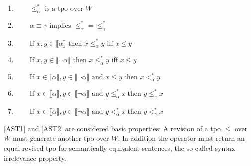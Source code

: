 \documentclass[english, 12pt]{scrartcl}
\theoremstyle{definition}
\theoremstyle{definition}
\theoremstyle{definition}
\newcommand{\modelsOf}[1]{\llbracket #1 \rrbracket}
\begin{document}
\begin{enumerate}[wide=0pt, widest=99,leftmargin=\parindent,label = ($\ast\arabic*$)]
    \item\label{AST1} $\qquad \leq_{\alpha}^{\ast} \textrm{ is a tpo over } W$
    \item\label{AST2} $\qquad\alpha \equiv \gamma \textrm{ implies } \leq_{\alpha}^{\ast}=\leq_{\gamma}^{\ast}$
    \item\label{AST3} $\qquad \textrm{If } x, y \in \modelsOf{\alpha} \textrm{ then } x \leq_{\alpha}^{\ast} y \textrm{ iff } x \leq y$
    \item\label{AST4} $\qquad \textrm{If } x, y \in \modelsOf{\neg\alpha} \textrm{ then } x \leq_{\alpha}^{\ast} y \textrm{ iff } x \leq y$
    \item\label{AST5} $\qquad \textrm{If } x \in \modelsOf{\alpha}, y \in \modelsOf{\neg\alpha} \textrm{ and } x \leq y \textrm{ then } x <_{\alpha}^{\ast} y$
    \item\label{AST6} $\qquad \textrm{If } x \in \modelsOf{\alpha}, y \in \modelsOf{\neg\alpha} \textrm{ and } y \leq_{\alpha}^{\ast} x \textrm{ then } y \leq_{\gamma}^{\ast} x$
    \item\label{AST7} $\qquad \textrm{If } x \in \modelsOf{\alpha}, y \in \modelsOf{\neg\alpha} \textrm{ and } y <_{\alpha}^{\ast} x \textrm{ then } y <_{\gamma}^{\ast} x$
\end{enumerate}


\ref{AST1} and \ref{AST2} are considered basic properties: A revision of a tpo $\leq$ over $W$ must generate another tpo over $W$. In addition the operator must return an equal revised tpo for semantically equivalent sentences, the so called syntax-irrelevance property.
\end{document}

